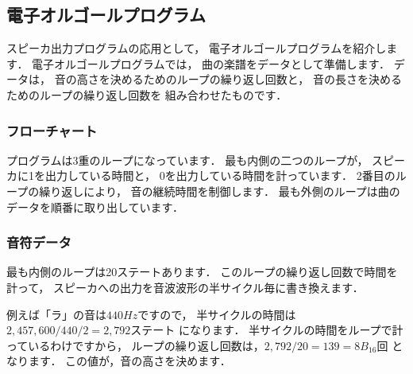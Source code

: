 \newpage
\subsection{電子オルゴールプログラム}

スピーカ出力プログラムの応用として，
電子オルゴールプログラムを紹介します．
電子オルゴールプログラムでは，
曲の楽譜をデータとして準備します．
データは，
音の高さを決めるためのループの繰り返し回数と，
音の長さを決めるためのループの繰り返し回数を
組み合わせたものです．

\subsubsection{フローチャート}

プログラムは3重のループになっています．
最も内側の二つのループが，
スピーカに1を出力している時間と，
0を出力している時間を計っています．
2番目のループの繰り返しにより，
音の継続時間を制御します．
最も外側のループは曲のデータを順番に取り出しています．

\begin{center}
\epsfxsize=3.3cm
\end{center}

\subsubsection{音符データ}

最も内側のループは20ステートあります．
このループの繰り返し回数で時間を計って，
スピーカへの出力を音波波形の半サイクル毎に書き換えます．

例えば「ラ」の音は$440Hz$ですので，
半サイクルの時間は $2,457,600 / 440 / 2 = 2,792ステート$ になります．
半サイクルの時間をループで計っているわけですから，
ループの繰り返し回数は，$2,792 / 20 = 139 = 8B_{16}回$ となります．
この値が，音の高さを決めます．

\begin{center}
\epsfxsize=5.0cm
\end{center}

